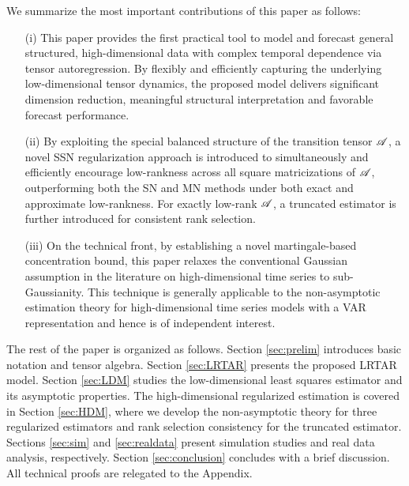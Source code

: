 \documentclass[12pt]{article}
\newcommand{\cm}[1]{\mbox{\boldmath$\mathscr{#1}$}}
\begin{document}
We summarize  the most important contributions of this paper as follows:
\begin{enumerate}
	\item[(i)] 	This paper provides the first practical tool to model and forecast general structured, high-dimensional data with complex temporal dependence via tensor autoregression.
    By flexibly and efficiently capturing the underlying low-dimensional tensor dynamics, the proposed model delivers significant dimension reduction, meaningful  structural interpretation and favorable forecast performance. 

	
	\item [(ii)] By  exploiting the special balanced structure of the transition tensor $\cm{A}$, a novel  SSN regularization approach is introduced to simultaneously and efficiently encourage low-rankness across all square matricizations of $\cm{A}$, outperforming both the SN and MN methods under both exact and  approximate low-rankness. For exactly low-rank $\cm{A}$, a truncated  estimator is further introduced for consistent rank selection. 
	
	
	\item[(iii)] On the technical front, by establishing a novel martingale-based concentration bound, this paper relaxes the conventional Gaussian assumption in the literature on high-dimensional time series to sub-Gaussianity. This technique is generally applicable to the non-asymptotic estimation theory for  high-dimensional time series models with a VAR representation and hence is of independent interest.
	

\end{enumerate}


The rest of the paper is organized as follows. Section \ref{sec:prelim} introduces basic notation and tensor algebra. Section \ref{sec:LRTAR} presents the proposed LRTAR model. Section \ref{sec:LDM} studies the low-dimensional least squares estimator and its asymptotic properties. The high-dimensional regularized estimation is covered in Section \ref{sec:HDM}, where we develop the non-asymptotic theory for three regularized estimators and rank selection consistency for the truncated estimator. Sections \ref{sec:sim} and \ref{sec:realdata} present simulation studies and real data analysis, respectively. Section \ref{sec:conclusion} concludes with a brief discussion. All technical proofs are relegated to the Appendix.
\end{document}
